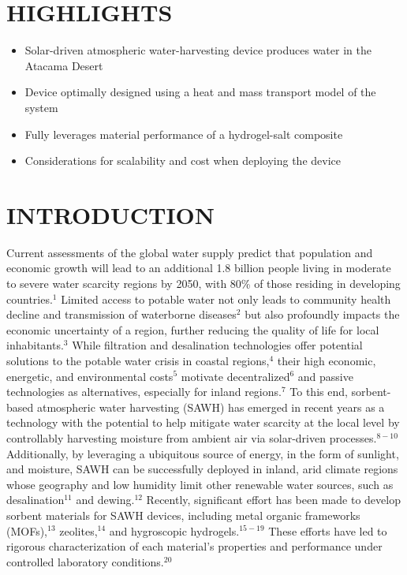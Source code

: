 \documentclass[11pt]{article}
\begin{document}
\section*{HIGHLIGHTS}

\begin{itemize}[leftmargin=*,nosep]
\item Solar-driven atmospheric water-harvesting device produces water in the Atacama Desert
\item Device optimally designed using a heat and mass transport model of the system
\item Fully leverages material performance of a hydrogel-salt composite
\item Considerations for scalability and cost when deploying the device
\end{itemize}

\section{INTRODUCTION}

Current assessments of the global water supply predict that population and economic growth will lead to an additional 1.8 billion people living in moderate to severe water scarcity regions by 2050, with 80\% of those residing in developing countries.$^{1}$ Limited access to potable water not only leads to community health decline and transmission of waterborne diseases$^{2}$ but also profoundly impacts the economic uncertainty of a region, further reducing the quality of life for local inhabitants.$^{3}$ While filtration and desalination technologies offer potential solutions to the potable water crisis in coastal regions,$^{4}$ their high economic, energetic, and environmental costs$^{5}$ motivate decentralized$^{6}$ and passive technologies as alternatives, especially for inland regions.$^{7}$ To this end, sorbent-based atmospheric water harvesting (SAWH) has emerged in recent years as a technology with the potential to help mitigate water scarcity at the local level by controllably harvesting moisture from ambient air via solar-driven processes.$^{8-10}$ Additionally, by leveraging a ubiquitous source of energy, in the form of sunlight, and moisture, SAWH can be successfully deployed in inland, arid climate regions whose geography and low humidity limit other renewable water sources, such as desalination$^{11}$ and dewing.$^{12}$ Recently, significant effort has been made to develop sorbent materials for SAWH devices, including metal organic frameworks (MOFs),$^{13}$ zeolites,$^{14}$ and hygroscopic hydrogels.$^{15-19}$ These efforts have led to rigorous characterization of each material's properties and performance under controlled laboratory conditions.$^{20}$
\end{document}
